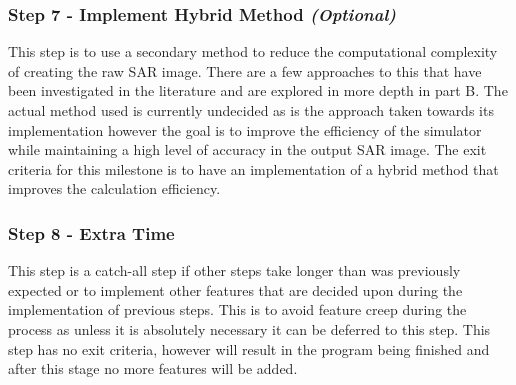 \subsubsection{Step 7 - Implement Hybrid Method \textit{(Optional)}}
This step is to use a secondary method to reduce the computational complexity of creating the raw SAR image. There are a few approaches to this that have been investigated in the literature and are explored in more depth in part B. The actual method used is currently undecided as is the approach taken towards its implementation however the goal is to improve the efficiency of the simulator while maintaining a high level of accuracy in the output SAR image. The exit criteria for this milestone is to have an implementation of a hybrid method that improves the calculation efficiency.

\subsubsection{Step 8 - Extra Time} 
This step is a catch-all step if other steps take longer than was previously expected or to implement other features that are decided upon during the implementation of previous steps. This is to avoid feature creep during the process as unless it is absolutely necessary it can be deferred to this step. This step has no exit criteria, however will result in the program being finished and after this stage no more features will be added.
